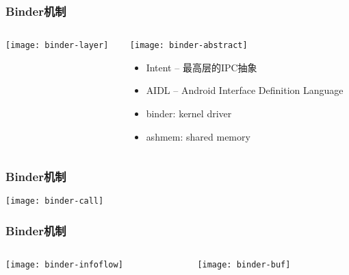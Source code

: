 \begin{frame}[fragile]
	\frametitle{Binder机制}
	
	\begin{columns}
		\begin{column}{.5\textwidth}
			\texttt{[image: binder-layer]}
			
		\end{column}
		\begin{column}{.5\textwidth}
		\texttt{[image: binder-abstract]}	
				\begin{itemize}
		\item Intent -- 最高层的IPC抽象
		\item AIDL -- Android Interface Definition Language
		\item binder: kernel driver
		\item ashmem: shared memory
		\end{itemize}
			
		\end{column}
	\end{columns}
\end{frame}
\begin{frame}[plain]
	\frametitle{Binder机制}
	\centering
	\texttt{[image: binder-call]}
	
\end{frame}

\begin{frame}[plain]
	\frametitle{Binder机制}
	
	
		\begin{columns}
		\begin{column}{.6\textwidth}

			\texttt{[image: binder-infoflow]}
			
		\end{column}
		\begin{column}{.4\textwidth}
			\texttt{[image: binder-buf]}	
			
		\end{column}
	\end{columns}

\end{frame}

